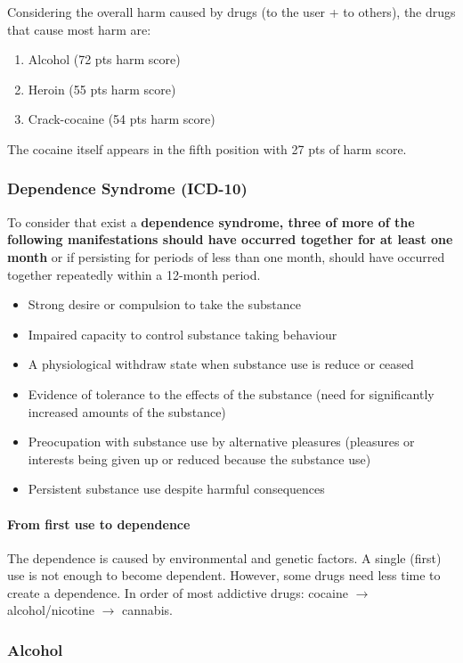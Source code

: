 \documentclass[12pt,article,oneside,a4paper]{memoir}
\begin{document}
Considering the overall harm caused by drugs (to the user + to others), the
drugs that cause most harm are:
\begin{enumerate}
\item Alcohol (72 pts harm score)
\item Heroin (55 pts harm score)
\item Crack-cocaine (54 pts harm score)
\end{enumerate}
The cocaine itself appears in the fifth position with 27 pts of harm score.

\subsubsection{Dependence Syndrome (ICD-10)}
To consider that exist a \textbf{dependence syndrome, three of more of the
following manifestations should have occurred together for at least one month}
or if persisting for periods of less than one month, should have occurred
together repeatedly within a 12-month period.

\begin{itemize}
\item Strong desire or compulsion to take the substance
\item Impaired capacity to control substance taking behaviour
\item A physiological withdraw state when substance use is reduce or ceased
\item Evidence of tolerance to the effects of the substance (need for
significantly increased amounts of the substance)
\item Preocupation with substance use by alternative pleasures (pleasures or
interests being given up or reduced because the substance use)
\item Persistent substance use despite harmful consequences
\end{itemize}

\paragraph{From first use to dependence} 
The dependence is caused by environmental and genetic factors. A single (first)
use is not enough to become dependent.
However, some drugs need less time to create a dependence. In order of most
addictive drugs: cocaine $\rightarrow$ alcohol/nicotine $\rightarrow$ cannabis.

\subsubsection{Alcohol}
\end{document}
